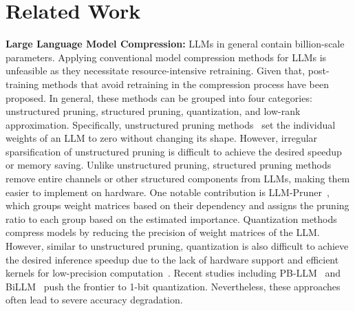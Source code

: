 \vspace{-1mm}
\section{Related Work}
\label{sec:related_works}
\vspace{-1mm}
\textbf{Large Language Model Compression:}
%
LLMs in general contain billion-scale parameters. Applying conventional model compression methods for LLMs is unfeasible as they necessitate resource-intensive retraining. Given that, post-training methods that avoid retraining in the compression process have been proposed. 
%
In general, these methods can be grouped into four categories: unstructured pruning, structured pruning, quantization, and low-rank approximation.
%
Specifically, unstructured pruning methods~\citep{DBLP:conf/icml/FrantarA23} set the individual weights of an LLM to zero without changing its shape. However, irregular sparsification of unstructured pruning is difficult to achieve the desired speedup or memory saving.
%
Unlike unstructured pruning, structured pruning methods~\citep{DBLP:conf/nips/MaFW23, DBLP:conf/iclr/AshkboosCNHH24, DBLP:journals/corr/abs-2406-10594} remove entire channels or other structured components from LLMs, making them easier to implement on hardware. One notable contribution is LLM-Pruner~\citep{DBLP:conf/nips/MaFW23}, which groups weight matrices based on their dependency and assigns the pruning ratio to each group based on the estimated importance. 
%
Quantization methods~\citep{DBLP:journals/corr/abs-2405-04532} compress models by reducing the precision of weight matrices of the LLM. However, similar to unstructured pruning, quantization is also difficult to achieve the desired inference speedup due to the lack of hardware support and efficient kernels for low-precision computation~\citep{DBLP:journals/corr/abs-2405-04532}.
%
Recent studies including PB-LLM~\citep{DBLP:conf/iclr/YuanSD24} and BiLLM~\citep{DBLP:conf/icml/HuangLQLZ0M024} push the frontier to 1-bit quantization. Nevertheless, these approaches often lead to severe accuracy degradation.



